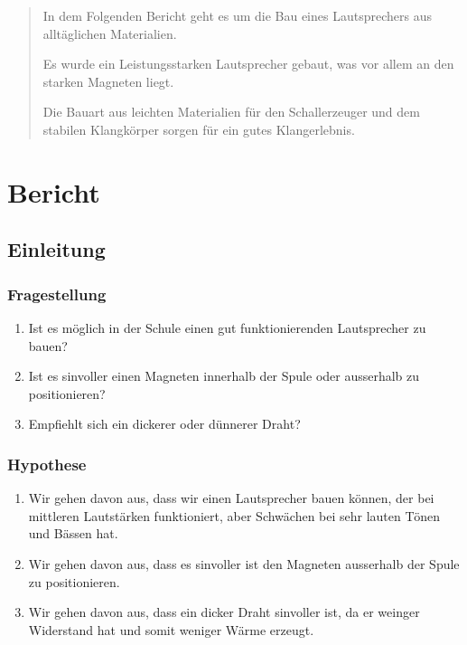\documentclass[a4paper,11pt]{report}
\begin{document}
\begin{abstract}
    In dem Folgenden Bericht geht es um die Bau eines Lautsprechers aus alltäglichen Materialien.

    Es wurde ein Leistungsstarken Lautsprecher gebaut, was vor allem an den starken Magneten liegt.

    Die Bauart aus leichten Materialien für den Schallerzeuger und dem stabilen Klangkörper sorgen für ein gutes Klangerlebnis.
    
\end{abstract}

\tableofcontents
\thispagestyle{empty}

\setcounter{page}{1}

\part{Bericht}

\chapter{Einleitung}
\section{Fragestellung}
\begin{enumerate}
    \item Ist es möglich in der Schule einen gut funktionierenden Lautsprecher zu bauen?
    \item Ist es sinvoller einen Magneten innerhalb der Spule oder ausserhalb zu positionieren?
    \item Empfiehlt sich ein dickerer oder dünnerer Draht?
\end{enumerate}
\section{Hypothese}
\begin{enumerate}
    \item Wir gehen davon aus, dass wir einen Lautsprecher bauen können, der bei mittleren Lautstärken funktioniert, aber Schwächen bei sehr lauten Tönen und Bässen hat.
    \item Wir gehen davon aus, dass es sinvoller ist den Magneten ausserhalb der Spule zu positionieren.
    \item Wir gehen davon aus, dass ein dicker Draht sinvoller ist, da er weinger Widerstand hat und somit weniger Wärme erzeugt.
\end{enumerate}
\end{document}
